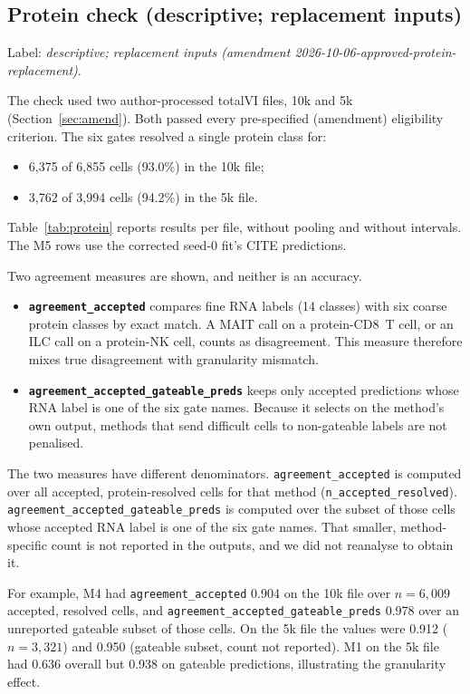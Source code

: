 \documentclass[11pt]{article}
\begin{document}
\subsection{Protein check (descriptive; replacement inputs)}

Label: \emph{descriptive; replacement inputs (amendment 2026-10-06-approved-protein-replacement)}.

The check used two author-processed totalVI files, 10k and 5k (Section~\ref{sec:amend}). Both passed every pre-specified (amendment) eligibility criterion. The six gates resolved a single protein class for:
\begin{itemize}
\item 6{,}375 of 6{,}855 cells (93.0\%) in the 10k file;
\item 3{,}762 of 3{,}994 cells (94.2\%) in the 5k file.
\end{itemize}
Table~\ref{tab:protein} reports results per file, without pooling and without intervals. The M5 rows use the corrected seed-0 fit's CITE predictions.

Two agreement measures are shown, and neither is an accuracy.
\begin{itemize}
\item \textbf{\nolinkurl{agreement_accepted}} compares fine RNA labels (14 classes) with six coarse protein classes by exact match. A MAIT call on a protein-CD8~T cell, or an ILC call on a protein-NK cell, counts as disagreement. This measure therefore mixes true disagreement with granularity mismatch.
\item \textbf{\nolinkurl{agreement_accepted_gateable_preds}} keeps only accepted predictions whose RNA label is one of the six gate names. Because it selects on the method's own output, methods that send difficult cells to non-gateable labels are not penalised.
\end{itemize}

\noindent The two measures have different denominators. \nolinkurl{agreement_accepted} is computed over all accepted, protein-resolved cells for that method (\nolinkurl{n_accepted_resolved}). \nolinkurl{agreement_accepted_gateable_preds} is computed over the subset of those cells whose accepted RNA label is one of the six gate names. That smaller, method-specific count is not reported in the outputs, and we did not reanalyse to obtain it.

For example, M4 had \nolinkurl{agreement_accepted} 0.904 on the 10k file over $n=6{,}009$ accepted, resolved cells, and \nolinkurl{agreement_accepted_gateable_preds} 0.978 over an unreported gateable subset of those cells. On the 5k file the values were 0.912 ($n=3{,}321$) and 0.950 (gateable subset, count not reported). M1 on the 5k file had 0.636 overall but 0.938 on gateable predictions, illustrating the granularity effect.
\end{document}
